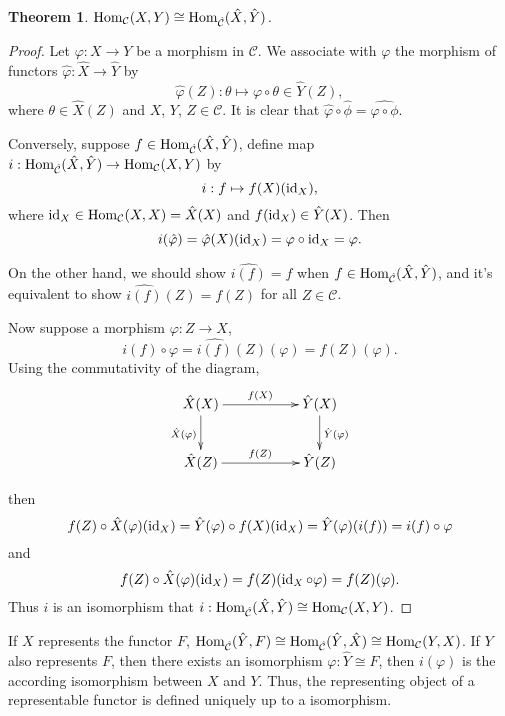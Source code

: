 \documentclass[10pt]{article}
\theoremstyle{plain}
\newtheorem{theo}{Theorem}
\newcommand{\cc}{\mathcal{C}}
\begin{document}
\begin{theo}
$\Hom_\cc (X,Y)\cong \Hom_{\hat{\cc}} (\hat{X},\hat{Y})$.
\end{theo}
\begin{proof}
	Let $\varphi:X\to Y$ be a morphism in $\cc$. We associate with $\varphi$ the morphism of functors $\hat{\varphi}:\hat{X}\to \hat{Y}$ by
	\[
		\hat{\varphi}(Z):\theta\mapsto\varphi\circ\theta\in \hat{Y}(Z),
	\]
	where $\theta\in \hat{X}(Z)$ and $X$, $Y$, $Z\in \cc$. It is clear that $\hat{\varphi}\circ \hat{\phi}=\widehat{\varphi\circ\phi}$.

	Conversely, suppose $f\in \Hom_{\hat{\cc}} (\hat{X},\hat{Y})$, define map $i:\Hom_{\hat{\cc}} (\hat{X},\hat{Y})\to \Hom_\cc (X,Y)$ by 
	\[
		i:f\mapsto f(X)(\operatorname{id}_X),
	\]
	where $\id_X\in \Hom_\cc(X,X)=\hat{X}(X)$ and $f(\operatorname{id}_X)\in \hat{Y}(X)$. Then 
	\[
		i(\hat{\varphi})=\hat{\varphi}(X)(\operatorname{id}_X)=\varphi\circ \operatorname{id}_X=\varphi.
	\]

	On the other hand, we should show $\widehat{i(f)}=f$ when $f\in \Hom_{\hat{\cc}} (\hat{X},\hat{Y})$, and it's equivalent to show $\widehat{i(f)}(Z)=f(Z)$ for all $Z\in\cc$.

	Now suppose a morphism $\varphi:Z\to X$,
	\[
		i(f)\circ\varphi=\widehat{i(f)}(Z)(\varphi)=f(Z)(\varphi).
	\]
	Using the commutativity of the diagram,
	\[
	\begin{xy}
		\xymatrix{
			\hat{X}(X)\ar[rr]^{f(X)} \ar[d]_{\hat{X}(\varphi)}&&\hat{Y}(X) \ar[d]^{\hat{Y}(\varphi)}\\
			\hat{X}(Z)\ar[rr]^{f(Z)}&&\hat{Y}(Z)
		}
	\end{xy}
	\]

	\noindent then
	\[
		f(Z)\circ\hat{X}(\varphi)(\operatorname{id}_X)=\hat{Y}(\varphi)\circ f(X)(\operatorname{id}_X)=\hat{Y}(\varphi)(i(f))=i(f)\circ \varphi
	\]
	and
	\[
		f(Z)\circ\hat{X}(\varphi)(\operatorname{id}_X)=f(Z)(\operatorname{id}_X\circ\varphi)=f(Z)(\varphi).
	\]
	Thus $i$ is an isomorphism that $i:\Hom_{\hat{\cc}} (\hat{X},\hat{Y})\cong \Hom_\cc (X,Y)$.
\end{proof}

If $X$ represents the functor $F$, $\Hom_{\hat{\cc}}(\hat{Y},F)\cong \Hom_{\hat{\cc}}(\hat{Y},\hat{X})\cong\Hom_\cc(Y,X)$. If $Y$ also represents $F$, then there exists an isomorphism $\varphi:\hat{Y}\cong F$, then $i(\varphi)$ is the according isomorphism between $X$ and $Y$. Thus, the representing object of a representable functor is defined uniquely up to a isomorphism.
\end{document}
